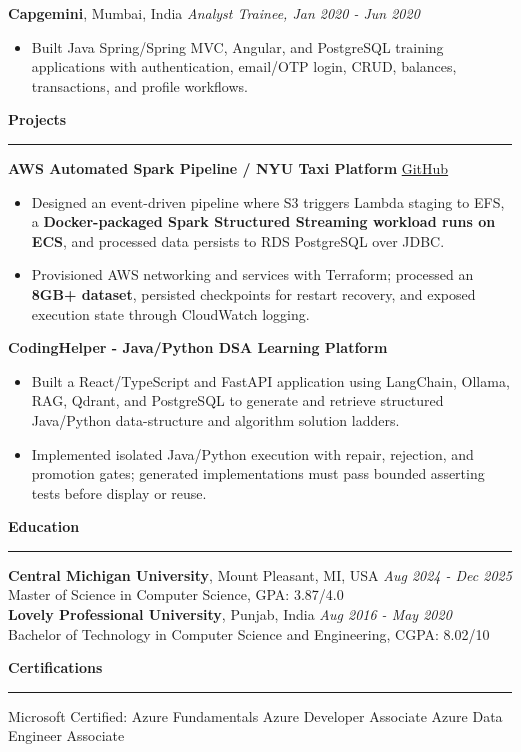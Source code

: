 \documentclass[11pt,letterpaper]{article}
\newcommand{\ressection}[1]{\Needspace{6\baselineskip}\vspace{8pt}\par\textbf{#1}\par\vspace{2pt}\hrule\vspace{5pt}}
\begin{document}
\textbf{Capgemini}, Mumbai, India \hfill \textit{Analyst Trainee, Jan 2020 - Jun 2020}
\begin{itemize}
  \item Built Java Spring/Spring MVC, Angular, and PostgreSQL training applications with authentication, email/OTP login, CRUD, balances, transactions, and profile workflows.
\end{itemize}

\ressection{Projects}
\textbf{AWS Automated Spark Pipeline / NYU Taxi Platform} \hfill \href{https://github.com/preferablehuman/AWS-automated-spark-pipeline}{GitHub}
\begin{itemize}
  \item Designed an event-driven pipeline where S3 triggers Lambda staging to EFS, a \textbf{Docker-packaged Spark Structured Streaming workload runs on ECS}, and processed data persists to RDS PostgreSQL over JDBC.
  \item Provisioned AWS networking and services with Terraform; processed an \textbf{8GB+ dataset}, persisted checkpoints for restart recovery, and exposed execution state through CloudWatch logging.
\end{itemize}
\par\vspace{2pt}
\textbf{CodingHelper - Java/Python DSA Learning Platform}
\begin{itemize}
  \item Built a React/TypeScript and FastAPI application using LangChain, Ollama, RAG, Qdrant, and PostgreSQL to generate and retrieve structured Java/Python data-structure and algorithm solution ladders.
  \item Implemented isolated Java/Python execution with repair, rejection, and promotion gates; generated implementations must pass bounded asserting tests before display or reuse.
\end{itemize}

\ressection{Education}
\textbf{Central Michigan University}, Mount Pleasant, MI, USA \hfill \textit{Aug 2024 - Dec 2025}\\
Master of Science in Computer Science, GPA: 3.87/4.0\\
\textbf{Lovely Professional University}, Punjab, India \hfill \textit{Aug 2016 - May 2020}\\
Bachelor of Technology in Computer Science and Engineering, CGPA: 8.02/10

\ressection{Certifications}
Microsoft Certified: Azure Fundamentals \textbar{} Azure Developer Associate \textbar{} Azure Data Engineer Associate
\end{document}
